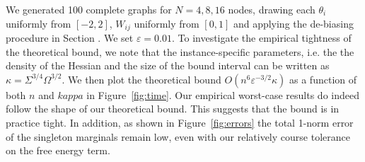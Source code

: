 \documentclass[english]{article}
\newcommand{\+}[1]{\ensuremath{\boldsymbol{\mathrm{#1}}}}
\begin{document}
We generated 100 complete graphs for $N = 4,8,16$ nodes, drawing each $\theta_i$ uniformly from $[-2,2]$, $W_{ij}$ uniformly from $[0, 1]$ and applying the de-biasing procedure in Section . We set $\varepsilon = 0.01$. To investigate the empirical tightness of the theoretical bound, we note that the instance-specific parameters, i.e. the the density of the Hessian and the size of the bound interval can be written as $\kappa = \Sigma^{3/4} \Omega^{3/2}$. We then plot the theoretical bound $O(n^6 \varepsilon^{-3/2} \kappa)$ as a function of both $n$ and $kappa$ in Figure~\ref{fig:time}. Our empirical worst-case results do indeed follow the shape of our theoretical bound. This suggests that the bound is in practice tight. In addition, as shown in Figure~\ref{fig:errors} the total 1-norm error of the singleton marginals remain low, even with our relatively course tolerance on the free energy term.
\end{document}
